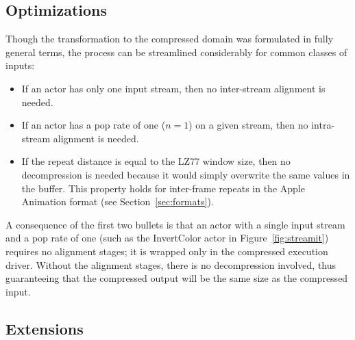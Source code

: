 \subsection{Optimizations}
\label{sec:opt}

Though the transformation to the compressed domain was formulated in
fully general terms, the process can be streamlined considerably for
common classes of inputs:
\begin{itemize}
\item If an actor has only one input stream, then no inter-stream
alignment is needed.
\item If an actor has a pop rate of one ($n=1$) on a given stream,
then no intra-stream alignment is needed.
\item If the repeat distance is equal to the LZ77 window size, then no
decompression is needed because it would simply overwrite the same
values in the buffer.  This property holds for inter-frame repeats in
the Apple Animation format (see Section~\ref{sec:formats}).
\end{itemize}
A consequence of the first two bullets is that an actor with a single
input stream and a pop rate of one (such as the InvertColor actor in
Figure~\ref{fig:streamit}) requires no alignment stages; it is wrapped
only in the compressed execution driver.  Without the alignment
stages, there is no decompression involved, thus guaranteeing that the
compressed output will be the same size as the compressed input.

\subsection{Extensions}
\label{sec:extensions}

